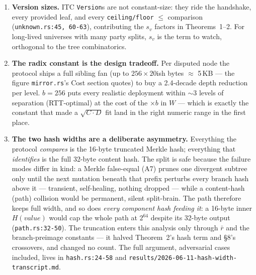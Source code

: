 \documentclass[11pt]{article}
\newcommand{\code}[1]{\texttt{#1}}
\theoremstyle{plain}
\begin{document}
\begin{enumerate}
  because the version is folded into the leaf path (\code{path.rs:32-50}),
  even a million-message single-party version-batch spreads uniformly ---
  concentration under few prefixes would require engineered BLAKE3
  outputs. (Contrast key-ordered Merkle trees, where a contiguous batch
  \emph{does} cluster.) Even granting an adversary clustered paths, the
  depth ceiling caps the damage at $W \le 32 \cdot b \cdot D$ and 18 RTT.
\item \textbf{Version sizes.} ITC \code{Version}s are not constant-size:
  they ride the handshake, every provided leaf, and every
  \code{ceiling/floor} $\le$ comparison (\code{unknown.rs:45, 60-63}),
  contributing the $s_v$ factors in Theorems~1--2. For long-lived
  universes with many party splits, $s_v$ is the term to watch, orthogonal
  to the tree combinatorics.
\item \textbf{The radix constant is the design tradeoff.} Per disputed
  node the protocol ships a full sibling fan (up to $256 \times 20$ish
  bytes $\approx$ 5\,KB --- the figure \code{mirror.rs}'s Cost section
  quotes) to buy a 2.4-decade depth reduction per level.
  $b = 256$ puts every realistic deployment within ${\sim}3$ levels of
  separation (RTT-optimal) at the cost of the $\times b$ in $W$ --- which
  is exactly the constant that made a $\sqrt{C \cdot D}$ fit land in the
  right numeric range in the first place.
\item \textbf{The two hash widths are a deliberate asymmetry.} Everything
  the protocol \emph{compares} is the 16-byte truncated Merkle hash;
  everything that \emph{identifies} is the full 32-byte content hash.
  The split is safe because the failure modes differ in kind: a Merkle
  false-equal (A7) prunes one divergent subtree only until the next
  mutation beneath that prefix perturbs every branch hash above it ---
  transient, self-healing, nothing dropped --- while a content-hash (path)
  collision would be permanent, silent split-brain. The path therefore
  keeps full width, and so does \emph{every component hash feeding it}: a
  16-byte inner $H(\textit{value})$ would cap the whole path at $2^{64}$
  despite its 32-byte output (\code{path.rs:32-50}). The truncation enters
  this analysis only through $\bar{r}$ and the branch-preimage constants
  --- it halved Theorem~2's hash term and \S8's crossovers, and changed
  no count. The full argument, adversarial cases included, lives in
  \code{hash.rs:24-58} and
  \code{results/2026-06-11-hash-width-transcript.md}.
\end{enumerate}
\end{document}
